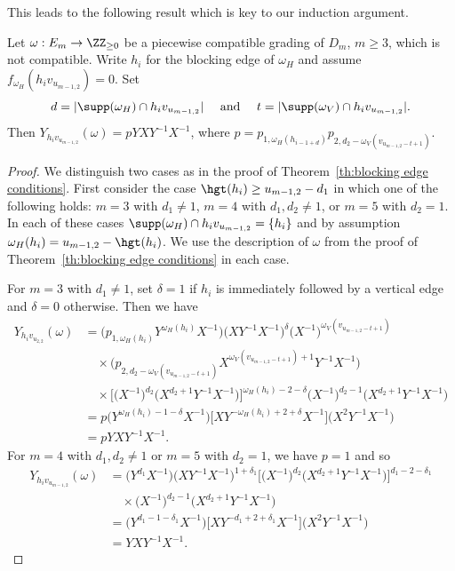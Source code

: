 This leads to the following result which is key to our induction argument.
\begin{corollary}
 \label{cor:incompatible collapse}
 Let $\omega:E_m\to\ZZ_{\ge0}$ be a piecewise compatible grading of $D_m$, $m\ge3$, which is not compatible. 
 Write $h_i$ for the blocking edge of $\omega_H$ and assume $f_{\omega_H}(h_iv_{u_{m-1,2}})=0$. 
 Set 
 \[d=|\supp(\omega_H)\cap h_iv_{u_{m-1,2}}|\quad\text{ and }\quad t=|\supp(\omega_V)\cap h_iv_{u_{m-1,2}}|.\]
 Then $Y_{h_iv_{u_{m-1,2}}}(\omega)=pYXY^{-1}X^{-1}$, where $p=p_{1,\omega_H(h_{i-1+d})}p_{2,d_2-\omega_V(v_{u_{m-1,2}-t+1})}$.
\end{corollary}
\begin{proof}
 We distinguish two cases as in the proof of Theorem~\ref{th:blocking edge conditions}.
 First consider the case $\hgt(h_i)\ge u_{m-1,2}-d_1$ in which one of the following holds: $m=3$ with $d_1\ne1$, $m=4$ with $d_1,d_2\ne1$, or $m=5$ with $d_2=1$.
 In each of these cases $\supp(\omega_H)\cap h_iv_{u_{m-1,2}}=\{h_i\}$ and by assumption $\omega_H(h_i)=u_{m-1,2}-\hgt(h_i)$.
 We use the description of $\omega$ from the proof of Theorem~\ref{th:blocking edge conditions} in each case.

 For $m=3$ with $d_1\ne1$, set $\delta=1$ if $h_i$ is immediately followed by a vertical edge and $\delta=0$ otherwise. 
 Then we have
 \begin{align*}
 Y_{h_iv_{u_{2,2}}}(\omega)
 &=\big(p_{1,\omega_H(h_i)}Y^{\omega_H(h_i)} X^{-1}\big)\big(XY^{-1}X^{-1}\big)^\delta\big(X^{-1}\big)^{\omega_V(v_{u_{m-1,2}-t+1})}\\
 &\quad\times\big(p_{2,d_2-\omega_V(v_{u_{m-1,2}-t+1})}X^{\omega_V(v_{u_{m-1,2}-t+1})+1}Y^{-1}X^{-1}\big)\\
 &\quad\times\Big[\big(X^{-1}\big)^{d_2}\big(X^{d_2+1}Y^{-1}X^{-1}\big)\Big]^{\omega_H(h_i)-2-\delta}\big(X^{-1}\big)^{d_2-1}\big(X^{d_2+1}Y^{-1}X^{-1}\big)\\
 &=p\big(Y^{\omega_H(h_i)-1-\delta}X^{-1}\big)\Big[XY^{-\omega_H(h_i)+2+\delta}X^{-1}\Big]\big(X^2Y^{-1}X^{-1}\big)\\
 &=pYXY^{-1}X^{-1}.
 \end{align*}
 For $m=4$ with $d_1,d_2\ne1$ or $m=5$ with $d_2=1$, we have $p=1$ and so
 \begin{align*}
 Y_{h_iv_{u_{m-1,2}}}(\omega)
 &=\big(Y^{d_1}X^{-1}\big)\big(XY^{-1}X^{-1}\big)^{1+\delta_1}\Big[\big(X^{-1}\big)^{d_2}\big(X^{d_2+1}Y^{-1}X^{-1}\big)\Big]^{d_1-2-\delta_1}\\
 &\quad\times\big(X^{-1}\big)^{d_2-1}\big(X^{d_2+1}Y^{-1}X^{-1}\big)\\
 &=\big(Y^{d_1-1-\delta_1}X^{-1}\big)\Big[XY^{-d_1+2+\delta_1}X^{-1}\Big]\big(X^2Y^{-1}X^{-1}\big)\\
 &=YXY^{-1}X^{-1}.
 \end{align*}


\end{proof}
